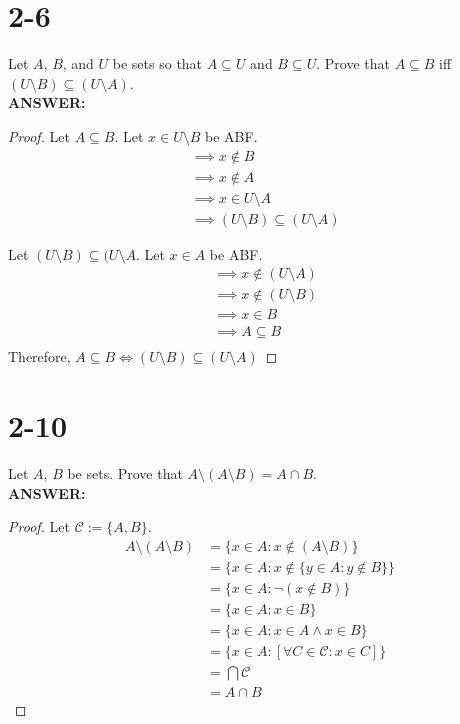 \documentclass{article}
\begin{document}
\section{2-6}
Let $A$, $B$, and $U$ be sets so that $A\subseteq U$ and $B \subseteq U$.  Prove
that $A \subseteq B$ iff $(U \setminus B) \subseteq (U \setminus A)$. \\
\textbf{ANSWER:}
\begin{proof} \hfill
\item[$\implies$] Let $A \subseteq B$.  Let $x \in U \setminus B$ be ABF.
    \begin{align*}
        &\implies x \not\in B \\
        &\implies x \not\in A \\
        &\implies x \in U \setminus A \\
        &\implies (U \setminus B) \subseteq (U \setminus A)
    \end{align*}
\item[$\impliedby$] Let $(U \setminus B) \subseteq (U \setminus A$.  Let
    $x \in A$ be ABF.
    \begin{align*}
        &\implies x \not\in (U \setminus A) \\
        &\implies x \not\in (U \setminus B) \\
        &\implies x \in B \\
        &\implies A \subseteq B \\
    \end{align*}
    Therefore, $A \subseteq B \iff (U \setminus B) \subseteq (U \setminus A)$
\end{proof}

\section{2-10}
Let $A$, $B$ be sets.  Prove that $A \setminus (A \setminus B) = A \cap B$. \\
\textbf{ANSWER:}
\begin{proof} \hfill \newline
    Let $\mathcal{C} := \{A, B\}$.
    \begin{align*}
        A \setminus (A \setminus B)
        &= \{x \in A : x \not\in (A \setminus B)\} \\
        &= \{x \in A : x \not\in \{y \in A : y \not\in B\}\} \\
        &= \{x \in A : \neg(x \not\in B)\} \\
        &= \{x \in A : x \in B\} \\
        &= \{x \in A : x \in A \land x \in B\} \\
        &= \{x \in A : [\forall C \in \mathcal{C} : x \in C]\} \\
        &= \bigcap \mathcal{C} \\
        &= A \cap B
    \end{align*}
\end{proof}
\end{document}
